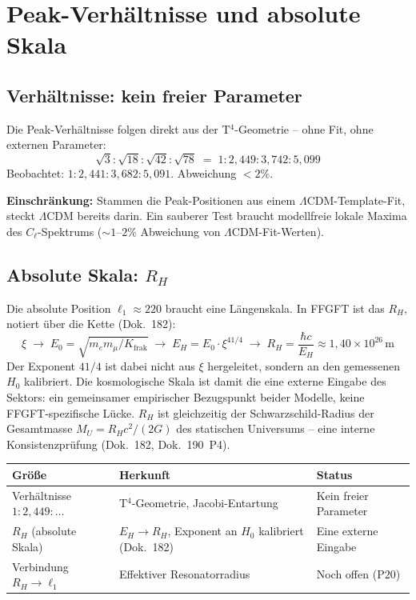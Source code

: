 \section{Peak-Verhältnisse und absolute Skala}

\subsection*{Verhältnisse: kein freier Parameter}

Die Peak-Verhältnisse folgen direkt aus der T$^4$-Geometrie --
ohne Fit, ohne externen Parameter:
\[
  \sqrt{3}:\sqrt{18}:\sqrt{42}:\sqrt{78}
  \;=\; 1:2{,}449:3{,}742:5{,}099
\]
Beobachtet: $1:2{,}441:3{,}682:5{,}091$. Abweichung $< 2\%$.

\textbf{Einschränkung:} Stammen die Peak-Positionen aus einem
$\Lambda$CDM-Template-Fit, steckt $\Lambda$CDM bereits darin.
Ein sauberer Test braucht modellfreie lokale Maxima des
$C_\ell$-Spektrums ($\sim 1$--$2\%$ Abweichung von
$\Lambda$CDM-Fit-Werten).

\subsection*{Absolute Skala: $R_H$}

Die absolute Position $\ell_1 \approx 220$ braucht eine Längenskala.
In FFGFT ist das $R_H$, notiert über die Kette (Dok.~182):
\[
  \xi \;\to\; E_0 = \sqrt{m_e m_\mu/K_{\text{frak}}} \;\to\;
  E_H = E_0 \cdot \xi^{41/4} \;\to\;
  R_H = \frac{\hbar c}{E_H} \approx 1{,}40 \times 10^{26}\,\text{m}
\]
Der Exponent $41/4$ ist dabei nicht aus $\xi$ hergeleitet, sondern an den
gemessenen $H_0$ kalibriert. Die kosmologische Skala ist damit die eine
externe Eingabe des Sektors: ein gemeinsamer empirischer Bezugspunkt beider
Modelle, keine FFGFT-spezifische Lücke. $R_H$ ist gleichzeitig der
Schwarzschild-Radius der Gesamtmasse $M_U = R_H c^2/(2G)$
des statischen Universums -- eine interne Konsistenzprüfung
(Dok.~182, Dok.~190~P4).

\begin{center}
\begin{tabular}{p{3.5cm}p{4.5cm}p{3.5cm}}
\toprule
\textbf{Größe} & \textbf{Herkunft} & \textbf{Status} \\
\midrule
Verhältnisse $1:2{,}449:\ldots$ &
  T$^4$-Geometrie, Jacobi-Entartung &
  Kein freier Parameter \\
\addlinespace
$R_H$ (absolute Skala) &
  $E_H \to R_H$, Exponent an $H_0$ kalibriert (Dok.~182) &
  Eine externe Eingabe \\
\addlinespace
Verbindung $R_H \to \ell_1$ &
  Effektiver Resonatorradius &
  Noch offen (P20) \\
\bottomrule
\end{tabular}
\end{center}


